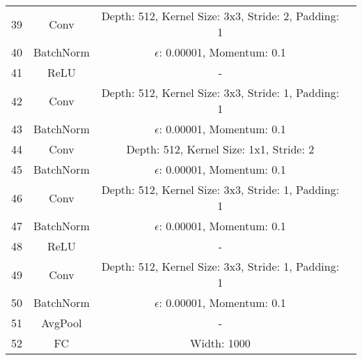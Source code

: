 \documentclass[10pt,twocolumn,letterpaper]{article}
\begin{document}
\begin{table}[ht]
\begin{tabular}{|l|c|c|r}
        
        \multirow{1}{0.5cm}{39} & Conv & Depth: 512, Kernel Size: 3x3, Stride: 2, Padding: 1\\
        \multirow{1}{0.5cm}{40} & BatchNorm & $\epsilon$: 0.00001, Momentum: 0.1\\
        \multirow{1}{0.5cm}{41} & ReLU & -\\
        \multirow{1}{0.5cm}{42} & Conv & Depth: 512, Kernel Size: 3x3, Stride: 1, Padding: 1\\
        \multirow{1}{0.5cm}{43} & BatchNorm & $\epsilon$: 0.00001, Momentum: 0.1\\
        \multirow{1}{0.5cm}{44} & Conv & Depth: 512, Kernel Size: 1x1, Stride: 2\\
        \multirow{1}{0.5cm}{45} & BatchNorm & $\epsilon$: 0.00001, Momentum: 0.1\\
        \multirow{1}{0.5cm}{46} & Conv & Depth: 512, Kernel Size: 3x3, Stride: 1, Padding: 1\\
        \multirow{1}{0.5cm}{47} & BatchNorm & $\epsilon$: 0.00001, Momentum: 0.1\\
        \multirow{1}{0.5cm}{48} & ReLU & -\\
        \multirow{1}{0.5cm}{49} & Conv & Depth: 512, Kernel Size: 3x3, Stride: 1, Padding: 1\\
        \multirow{1}{0.5cm}{50} & BatchNorm & $\epsilon$: 0.00001, Momentum: 0.1\\
        
        \multirow{1}{0.5cm}{51} & AvgPool & -\\
        \multirow{1}{0.5cm}{52} & FC & Width: 1000\\
        
        \hline
        
        \hline
        \bottomrule
    \end{tabular}
    \label{table:res_chart}
    \vspace{-6mm}
\end{table}
\end{document}
